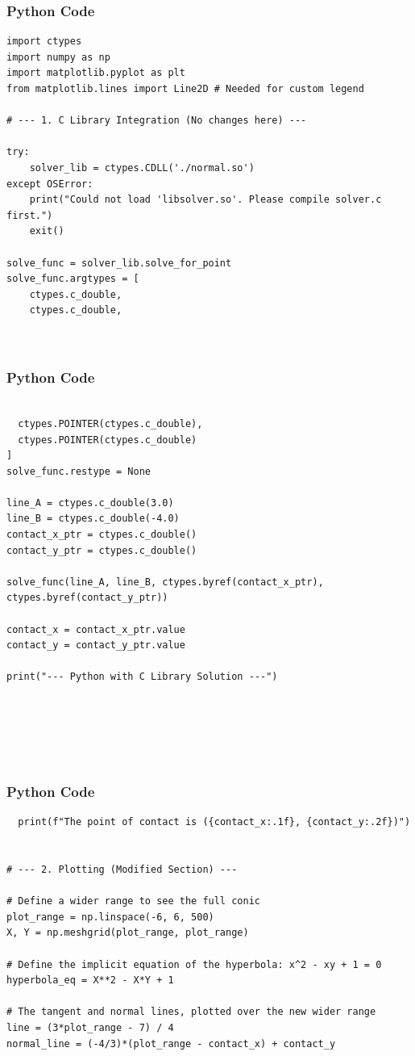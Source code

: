 \documentclass{beamer}
\begin{document}
    \begin{frame}[fragile]
        \frametitle{Python Code}
        \begin{lstlisting}
import ctypes
import numpy as np
import matplotlib.pyplot as plt
from matplotlib.lines import Line2D # Needed for custom legend

# --- 1. C Library Integration (No changes here) ---

try:
    solver_lib = ctypes.CDLL('./normal.so')
except OSError:
    print("Could not load 'libsolver.so'. Please compile solver.c first.")
    exit()

solve_func = solver_lib.solve_for_point
solve_func.argtypes = [
    ctypes.c_double,
    ctypes.c_double,
    
   

        \end{lstlisting}
    \end{frame}
    
    \begin{frame}[fragile]
        \frametitle{Python Code}
        \begin{lstlisting}

  ctypes.POINTER(ctypes.c_double),      
  ctypes.POINTER(ctypes.c_double)
]
solve_func.restype = None

line_A = ctypes.c_double(3.0)
line_B = ctypes.c_double(-4.0)
contact_x_ptr = ctypes.c_double()
contact_y_ptr = ctypes.c_double()

solve_func(line_A, line_B, ctypes.byref(contact_x_ptr), ctypes.byref(contact_y_ptr))

contact_x = contact_x_ptr.value
contact_y = contact_y_ptr.value

print("--- Python with C Library Solution ---")




   
        \end{lstlisting}
    \end{frame}
    
    \begin{frame}[fragile]
        \frametitle{Python Code}
        \begin{lstlisting}
  print(f"The point of contact is ({contact_x:.1f}, {contact_y:.2f})")


# --- 2. Plotting (Modified Section) ---

# Define a wider range to see the full conic
plot_range = np.linspace(-6, 6, 500)
X, Y = np.meshgrid(plot_range, plot_range)

# Define the implicit equation of the hyperbola: x^2 - xy + 1 = 0
hyperbola_eq = X**2 - X*Y + 1

# The tangent and normal lines, plotted over the new wider range
line = (3*plot_range - 7) / 4
normal_line = (-4/3)*(plot_range - contact_x) + contact_y


   
        \end{lstlisting}
    \end{frame}
    
\end{document}
